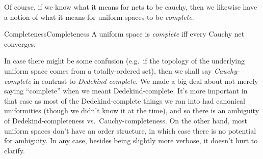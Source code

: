 Of course, if we know what it means for nets to be cauchy, then we likewise have a notion of what it means for uniform spaces to be \emph{complete}.
\begin{dfn}{Completeness}{Completeness}
A uniform space is \emph{complete} iff every Cauchy net converges.
\begin{rmk}
In case there might be some confusion (e.g.~if the topology of the underlying uniform space comes from a totally-ordered set), then we shall say \emph{Cauchy-complete} in contrast to \emph{Dedekind complete}.  We made a big deal about not merely saying ``complete'' when we meant Dedekind-complete.  It's more important in that case as most of the Dedekind-complete things we ran into had canonical uniformities (though we didn't know it at the time), and so there is an ambiguity of Dedekind-completeness vs.~Cauchy-completeness.  On the other hand, most uniform spaces don't have an order structure, in which case there is no potential for ambiguity.  In any case, besides being slightly more verbose, it doesn't hurt to clarify.
\end{rmk}
\end{dfn}

